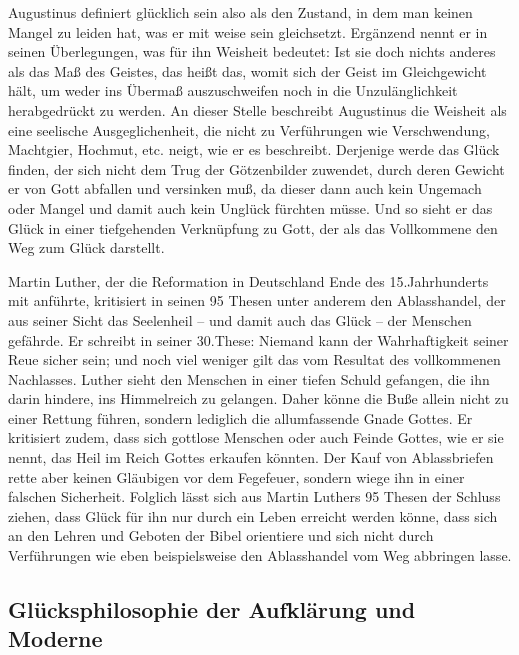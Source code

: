 Augustinus definiert \glqq glücklich sein\grqq{} also als den Zustand, in dem man keinen Mangel zu leiden hat, was er mit \glqq weise sein\grqq{} gleichsetzt. 
Ergänzend nennt er in seinen Überlegungen, was für ihn Weisheit bedeutet: \glqq Ist sie doch nichts anderes als das Maß des Geistes, das heißt das, womit sich der Geist im Gleichgewicht hält, um weder ins Übermaß auszuschweifen noch in die Unzulänglichkeit herabgedrückt zu werden.\grqq{}\cite[S.\,59]{A82} 
An dieser Stelle beschreibt Augustinus die Weisheit als eine seelische Ausgeglichenheit, die nicht zu Verführungen wie Verschwendung, Machtgier, Hochmut, etc. neigt, wie er es beschreibt. 
Derjenige werde das Glück finden, der sich nicht \glqq dem Trug der Götzenbilder zuwendet, durch deren Gewicht er von Gott abfallen und versinken muß\grqq{}, da dieser dann auch kein Ungemach oder Mangel und damit auch kein Unglück fürchten müsse. 
Und so sieht er das Glück in einer tiefgehenden Verknüpfung zu Gott, der als das Vollkommene den Weg zum Glück darstellt.

Martin Luther, der die Reformation in Deutschland Ende des 15.Jahrhunderts mit anführte, kritisiert in seinen 95 Thesen unter anderem den Ablasshandel, der aus seiner Sicht das Seelenheil -- und damit auch das Glück -- der Menschen gefährde. 
Er schreibt in seiner 30.These: \glqq Niemand kann der Wahrhaftigkeit seiner Reue sicher sein; und noch viel weniger gilt das vom Resultat des vollkommenen Nachlasses.\grqq{}\cite[S.\,56]{ML65}
Luther sieht den Menschen in einer tiefen Schuld gefangen, die ihn darin hindere, ins Himmelreich zu gelangen. 
Daher könne die Buße allein nicht zu einer Rettung führen, sondern lediglich die allumfassende Gnade Gottes. 
Er kritisiert zudem, dass sich gottlose Menschen oder auch Feinde Gottes, wie er sie nennt, das Heil im Reich Gottes erkaufen könnten. 
Der Kauf von Ablassbriefen rette aber keinen Gläubigen vor dem Fegefeuer, sondern wiege ihn in einer falschen Sicherheit\cite[S.\,58]{ML65}.
Folglich lässt sich aus Martin Luthers 95 Thesen der Schluss ziehen, dass Glück für ihn nur durch ein Leben erreicht werden könne, dass sich an den Lehren und Geboten der Bibel orientiere und sich nicht durch Verführungen wie eben beispielsweise den Ablasshandel vom Weg abbringen lasse.


\newpage

\subsection{Glücksphilosophie der Aufklärung und Moderne}

